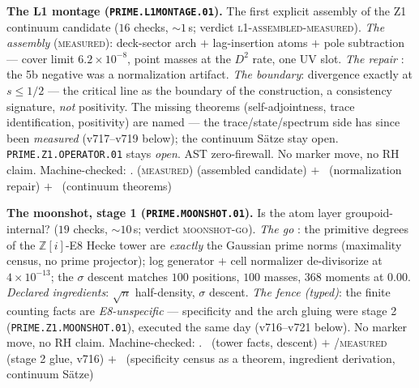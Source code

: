 \par\smallskip\noindent\textbf{The L1 montage
(\texttt{PRIME.L1MONTAGE.01}).}
The first explicit assembly of the Z1 continuum candidate ($16$
checks, ${\sim}1$\,s; verdict \textsc{l1-assembled-measured}).
\emph{The assembly} (\textsc{measured}): deck-sector arch $+$
lag-insertion atoms $+$ pole subtraction --- cover limit
$6.2\times10^{-8}$, point masses at the $D^2$ rate, one UV slot.
\emph{The repair} \mE: the 5b negative was a normalization artifact.
\emph{The boundary}: divergence exactly at $s\le1/2$ --- the
critical line as the boundary of the construction, a consistency
signature, \emph{not} positivity.  The missing theorems
(self-adjointness, trace identification, positivity) are named ---
the trace/state/spectrum side has since been \emph{measured}
(v717--v719 below); the continuum S\"atze stay open.
\texttt{PRIME.Z1.OPERATOR.01} stays \emph{open}.  AST zero-firewall.
No marker move, no RH claim.
Machine-checked: .
(\textsc{measured}) (assembled candidate) $+$ \mE\ (normalization
repair) $+$ \mO\ (continuum theorems)
\par\smallskip


\par\smallskip\noindent\textbf{The moonshot, stage 1
(\texttt{PRIME.MOONSHOT.01}).}
Is the atom layer groupoid-internal? ($19$ checks, ${\sim}10$\,s;
verdict \textsc{moonshot-go}).  \emph{The go} \mE: the primitive
degrees of the $\mathbb{Z}[i]$-E8 Hecke tower are \emph{exactly} the
Gaussian prime norms (maximality census, no prime projector); log
generator $+$ cell normalizer de-divisorize at $4\times10^{-13}$;
the $\sigma$ descent matches $100$ positions, $100$ masses, $368$
moments at $0.00$.  \emph{Declared ingredients}: $\sqrt n$
half-density, $\sigma$ descent.  \emph{The fence (typed)}: the
finite counting facts are \emph{E8-unspecific} --- specificity and
the arch gluing were stage 2 (\texttt{PRIME.Z1.MOONSHOT.01}),
executed the same day (v716--v721 below).  No
marker move, no RH claim.
Machine-checked: .
\mE\ (tower facts, descent) $+$ \mE/\textsc{measured} (stage 2 glue,
v716) $+$ \mO\ (specificity census as a theorem, ingredient
derivation, continuum S\"atze)
\par\smallskip


